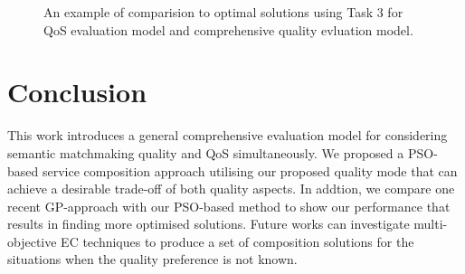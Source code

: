 \documentclass{llncs}
\begin{document}
\begin{figure}[h]
 \caption{An example of comparision to optimal solutions using Task 3 for QoS evaluation model and comprehensive quality evluation model.}
 \label{comparisontest}
\end{figure}


\section{Conclusion}\label{conclusion}
This work introduces a general comprehensive evaluation model for considering semantic matchmaking quality and QoS simultaneously. We proposed a PSO-based service composition approach utilising our proposed quality mode that can achieve a desirable trade-off of both quality aspects. In addtion, we compare one recent GP-approach with our PSO-based method to show our performance that results in finding more optimised solutions. Future works can investigate multi-objective EC techniques to produce a set of composition solutions for the situations when the quality preference is not known.




\end{document}
